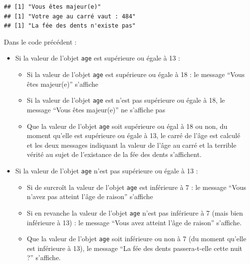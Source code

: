 \documentclass[
  11pt,
]{book}
\providecommand{\tightlist}{%
  \setlength{\itemsep}{0pt}\setlength{\parskip}{0pt}}
\numberwithin{equation}{section}
\numberwithin{countremarque}{section}
\begin{document}
\begin{lstlisting}
## [1] "Vous êtes majeur(e)"
## [1] "Votre age au carré vaut : 484"
## [1] "La fée des dents n'existe pas"
\end{lstlisting}

Dans le code précédent :

\begin{itemize}
\item
  Si la valeur de l'objet \texttt{age} est supérieure ou égale à 13 :

  \begin{itemize}
  \tightlist
  \item
    Si la valeur de l'objet \texttt{age} est supérieure ou égale à 18 : le message ``Vous êtes majeur(e)'' s'affiche
  \item
    Si la valeur de l'objet \texttt{age} est n'est pas supérieure ou égale à 18, le message ``Vous êtes majeur(e)'' ne s'affiche pas
  \item
    Que la valeur de l'objet \texttt{age} soit supérieure ou égal à 18 ou non, du moment qu'elle est supérieure ou égale à 13, le carré de l'âge est calculé et les deux messages indiquant la valeur de l'âge au carré et la terrible vérité au sujet de l'existance de la fée des dents s'affichent.
  \end{itemize}
\item
  Si la valeur de l'objet \texttt{age} n'est pas supérieure ou égale à 13 :

  \begin{itemize}
  \tightlist
  \item
    Si de surcroît la valeur de l'objet \texttt{age} est inférieure à 7 : le message ``Vous n'avez pas atteint l'âge de raison'' s'affiche
  \item
    Si en revanche la valeur de l'objet \texttt{age} n'est pas inférieure à 7 (mais bien inférieure à 13) : le message ``Vous avez atteint l'âge de raison'' s'affiche.
  \item
    Que la valeur de l'objet \texttt{age} soit inférieure ou non à 7 (du moment qu'elle est inférieure à 13), le message ``La fée des dents passera-t-elle cette nuit ?'' s'affiche.
  \end{itemize}
\end{itemize}
\end{document}
